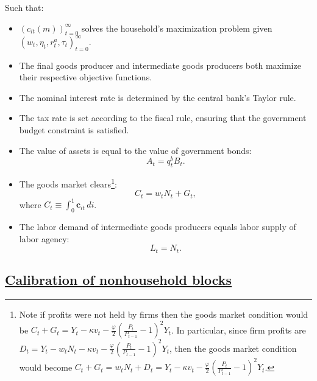 \documentclass{econsocart}
\begin{document}
Such that:
\begin{itemize}[label=--]
  \item
        ${\left(c_{it}(m)\right)}_{t=0}^{\infty}$  solves the household's maximization problem given ${\left( w_{t}, \eta_{t},  r^{a}_{t} , \tau_{t} \right)}_{t=0}^{\infty}$.
  \item
        The final goods producer and intermediate goods producers both maximize their respective objective functions.
  \item
        The nominal interest rate is determined by the central bank's Taylor rule.
  \item
        The tax rate is set according to the fiscal rule, ensuring that the government budget constraint is satisfied.
  \item
        The value of assets is equal to the value of government bonds:
        \[
          A_t =  q^{b}_{t}B_{t}.
        \]
  \item
        The goods market clears\footnote{Note if profits were not held by firms then the goods market condition would be $ C_{t}  + G_{t}  = Y_{t} -  \kappa v_{t} - \frac{\varphi}{2}{\left( \frac{P_{t}}{P_{t-1}} - 1\right)}^{2} Y_{t}  $.  In particular, since firm profits are $D_{t} = Y_{t} -  w_{t} N_{t}  - \kappa v_{t} - \frac{\varphi}{2}{\left( \frac{P_{t}}{P_{t-1}} - 1\right)}^{2} Y_{t} $, then the goods market condition would become $ C_{t}  + G_{t}  =w_{t} N_{t}  + D_{t} = Y_{t} -  \kappa v_{t} - \frac{\varphi}{2}{\left( \frac{P_{t}}{P_{t-1}} - 1\right)}^{2} Y_{t}  $. }:
        \[
          C_{t}  = w_{t} N_{t}  + G_{t},
        \]
        where $C_{t} \equiv  \int_{0}^{1} \textbf{c}_{it} \, di$.
  \item
        The labor demand of intermediate goods producers equals labor supply of labor agency:
        \[
          L_{t} =  N_{t}.
        \]
\end{itemize}

\begin{table}
  \begin{center}
    \renewcommand{\arraystretch}{1.6}
    \caption{Calibration}\whenintegrated{\label{table:Calibration}} %
  \end{center}
\end{table}

\subsection{\href{https://econ-ark.github.io/HAFiscal/\#sec:hank-calibration}{Calibration of nonhousehold blocks }}\whenintegrated{\label{sec:hank-calibration}}
\end{document}
